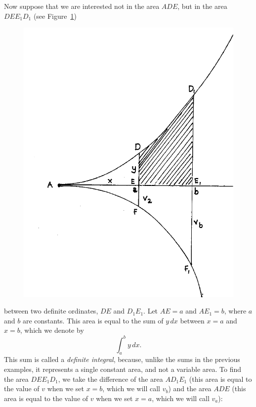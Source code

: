 \documentclass[twoside,openright]{article}
\begin{document}
\label{defint}
Now suppose that we are interested not in the area $ADE$, but in the area $DEE_1D_1$ (see Figure~\ref{sumab2})
\begin{figure}[htp]
\begin{center}
\includegraphics[width=\textwidth]{fig/Figure47}
\caption{}
\label{sumab2}
\vspace{-10pt}
\end{center}
\end{figure}  between two definite ordinates, $DE$ and $D_1E_1$.  Let $AE =a$ and $AE_1 =b$, where $a$ and $b$ are constants.  This area is equal to the sum of $y\,dx$ between $x=a$ and $x=b$, which we denote by
$$\int_a^b\!y\,dx.$$
This sum is called a {\em definite integral}, because, unlike the sums in the previous examples, it represents a single constant area, and not a variable area.  To find the area $DEE_1D_1$, we take the difference of the area $AD_1E_1$ (this area is equal to the value of $v$ when we set $x=b$, which we will call $v_b$) and the area $ADE$ (this area is equal to the value of $v$ when we set $x=a$, which we will call $v_a$):
\end{document}
